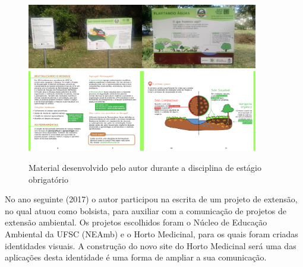 \begin{figure}[!htbp]
\centering
\caption{\label{fig-bosque}Material desenvolvido pelo autor durante a disciplina de estágio obrigatório}
\includegraphics[width=0.45\textwidth]{images/drive/image_1.jpg}\includegraphics[width=0.45\textwidth]{images/drive/image_2.jpg}
\includegraphics[width=0.45\textwidth]{images/drive/image_3.png}\includegraphics[width=0.45\textwidth]{images/drive/image_4.png}
\end{figure}

No ano seguinte (2017) o autor participou na escrita de um projeto de extensão, no qual atuou como bolsista, para auxiliar com a comunicação de projetos de extensão ambiental. Os projetos escolhidos foram o Núcleo de Educação Ambiental da UFSC (NEAmb) e o Horto Medicinal, para os quais foram criadas identidades visuais. A construção do novo site do Horto Medicinal será uma das aplicações desta identidade é uma forma de ampliar a sua comunicação.

